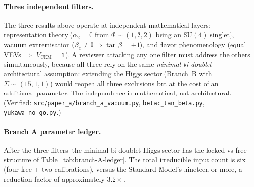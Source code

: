 \documentclass[11pt,a4paper]{article}
\theoremstyle{plain}
\theoremstyle{definition}
\theoremstyle{remark}
\begin{document}
\paragraph{Three independent filters.}
The three results above operate at independent mathematical layers:
representation theory ($\alpha_2 = 0$ from
$\Phi \sim (1, 2, 2)$ being an $\mathrm{SU}(4)$ singlet),
vacuum extremisation
($\beta_c \neq 0 \Rightarrow \tan\beta = \pm 1$),
and flavor phenomenology
(equal VEVs $\Rightarrow$ $V_{\mathrm{CKM}} = \mathbb{1}$).
A reviewer attacking any one filter must address the others
simultaneously, because all three rely on the same
\emph{minimal bi-doublet} architectural assumption: extending the
Higgs sector (Branch~B with $\Sigma \sim (15,1,1)$) would reopen
all three exclusions but at the cost of an additional parameter.
The independence is mathematical, not architectural.
(Verified: \nolinkurl{src/paper_a/branch_a_vacuum.py},
\texttt{betac\_tan\_beta.py}, \texttt{yukawa\_no\_go.py}.)

\paragraph{Branch A parameter ledger.}
After the three filters, the minimal bi-doublet Higgs sector has the
locked-vs-free structure of Table~\ref{tab:branch-A-ledger}.
The total irreducible input count is six (four free + two calibrations),
versus the Standard Model's nineteen-or-more, a reduction factor of
approximately $3.2\times$.
\end{document}
